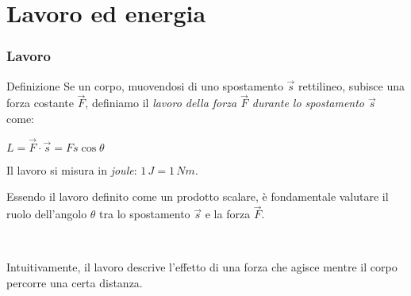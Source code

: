 \documentclass[]{beamer}
\theoremstyle{plain}
\begin{document}
\section{Lavoro ed energia}


\begin{frame}
  \frametitle{Lavoro}
  \begin{block}{Definizione}
Se un corpo, muovendosi di uno spostamento $ \vec{s} $ rettilineo, subisce una forza costante $ \vec{F} $, definiamo il \emph{lavoro della forza $ \vec{F} $ durante lo spostamento $ \vec{s} $} come:
\begin{center}
\colorbox{blue!30}{$ L = \vec{F} \cdot \vec{s} = Fs\cos\theta $}
\end{center}
Il lavoro si misura in \emph{joule}: $ 1 \, J = 1 \, Nm $.
\end{block}\pause
Essendo il lavoro definito come un prodotto scalare, è fondamentale valutare il \alert<2>{ruolo dell'angolo $ \theta $} tra lo spostamento $ \vec{s} $ e la forza $ \vec{F} $.\pause

~

Intuitivamente, il lavoro descrive \alert<3>{l'effetto di una forza che agisce mentre il corpo percorre una certa distanza}.
\end{frame}
\end{document}
